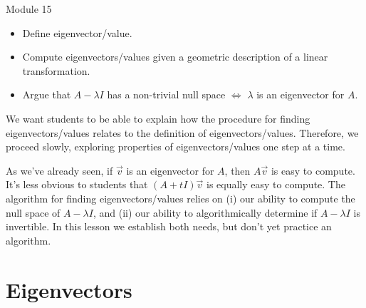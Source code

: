 \begin{lesson}

	Module 15

	\begin{itemize}
		\item Define eigenvector/value.
		\item Compute eigenvectors/values given a geometric description of a linear transformation.
		\item Argue that $A-\lambda I$ has a non-trivial null space $\iff$ $\lambda$ is an eigenvector for $A$.
	\end{itemize}

	We want students to be able to explain how the procedure for finding eigenvectors/values
	relates to the definition of eigenvectors/values. Therefore, we proceed slowly, exploring
	properties of eigenvectors/values one step at a time.

	As we've already seen, if $\vec v$ is an eigenvector for $A$, then $A\vec v$ is easy to compute.
	It's less obvious to students that $(A+tI)\vec v$ is equally easy to compute.
	The algorithm for
	finding eigenvectors/values relies on (i) our ability to compute the null space of $A-\lambda I$,
	and (ii) our ability to algorithmically determine if $A-\lambda I$ is invertible. In this lesson we
	establish both needs, but don't yet practice an algorithm.


\end{lesson}
	\bookonlynewpage
\section*{Eigenvectors}


